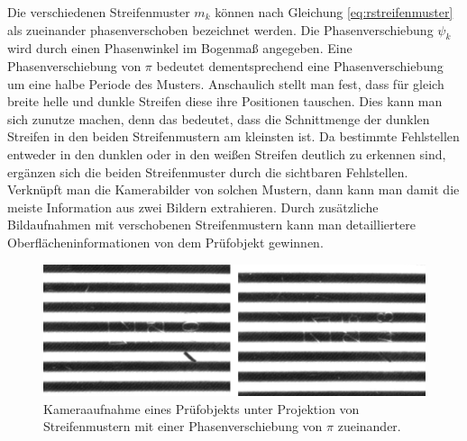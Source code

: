 {
	\begin{figure}[H]
		\centering
		
		\label{tikz:abbRechteckStreifenmuster}
	\end{figure}
}
%
%
\noindent
Die verschiedenen Streifenmuster $m_k$ können nach Gleichung \ref{eq:rstreifenmuster} als zueinander phasenverschoben bezeichnet werden.
Die Phasenverschiebung $\psi_k$ wird durch einen Phasenwinkel im Bogenmaß angegeben.
Eine Phasenverschiebung von $ \pi $ bedeutet dementsprechend eine Phasenverschiebung um eine halbe Periode des Musters.
Anschaulich stellt man fest, dass für gleich breite helle und dunkle Streifen diese ihre Positionen tauschen.
Dies kann man sich zunutze machen, denn das bedeutet, dass die Schnittmenge der dunklen Streifen in den beiden Streifenmustern am kleinsten ist.
Da bestimmte Fehlstellen entweder in den dunklen oder in den weißen Streifen deutlich zu erkennen sind, ergänzen sich die beiden Streifenmuster durch die sichtbaren Fehlstellen.
Verknüpft man die Kamerabilder von solchen Mustern, dann kann man damit die meiste Information aus zwei Bildern extrahieren.
Durch zusätzliche Bildaufnahmen mit verschobenen Streifenmustern kann man detailliertere Oberflächeninformationen von dem Prüfobjekt gewinnen.

\begin{figure}[H]
	\centering
	\includegraphics[width=\textwidth]{03_sichtpruefungDurchLichtstreuung/einsatzVonMehrerenStreifenmustern/figures/imageToLink}
	\caption[Zu verknüpfende Bilder]{Kameraaufnahme eines Prüfobjekts unter Projektion von Streifenmustern mit einer Phasenverschiebung von $ \pi $ zueinander.}
	\label{img:imageToLink}
\end{figure}

